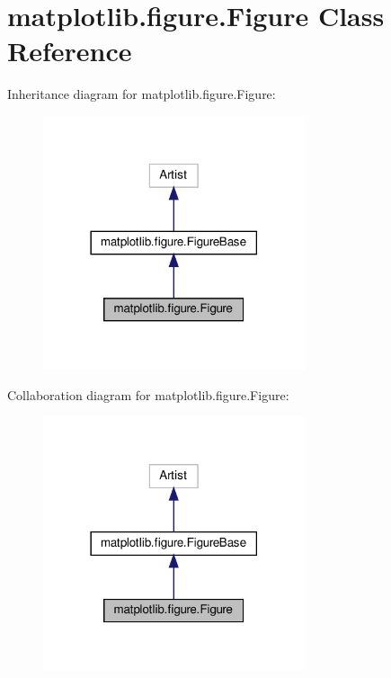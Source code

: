 \hypertarget{classmatplotlib_1_1figure_1_1Figure}{}\section{matplotlib.\+figure.\+Figure Class Reference}
\label{classmatplotlib_1_1figure_1_1Figure}


Inheritance diagram for matplotlib.\+figure.\+Figure\+:
\nopagebreak
\begin{figure}[H]
\begin{center}
\leavevmode
\includegraphics[width=218pt]{classmatplotlib_1_1figure_1_1Figure__inherit__graph}
\end{center}
\end{figure}


Collaboration diagram for matplotlib.\+figure.\+Figure\+:
\nopagebreak
\begin{figure}[H]
\begin{center}
\leavevmode
\includegraphics[width=218pt]{classmatplotlib_1_1figure_1_1Figure__coll__graph}
\end{center}
\end{figure}
